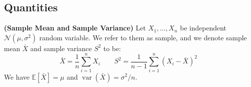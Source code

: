 \subsection{Quantities}

\begin{definition}{\textbf{(Sample Mean and Sample Variance)}}
    Let $X_1,\dots,X_n$ be independent $\mathcal{N}(\mu, \sigma^2)$ random variable. We refer to them as sample, and we denote sample mean $\bar{X}$ and sample variance $S^2$ to be:
    \begin{equation*}
        \bar{X} = \frac{1}{n} \sum^n_{i=1}X_i \qquad S^2 = \frac{1}{n-1}\sum^n_{i=1}(X_i - \bar{X})^2
    \end{equation*}
    We have $\mathbb{E}[\bar{X}] = \mu$ and $\operatorname{var}(\bar{X}) = \sigma^2/n$.
\end{definition}

